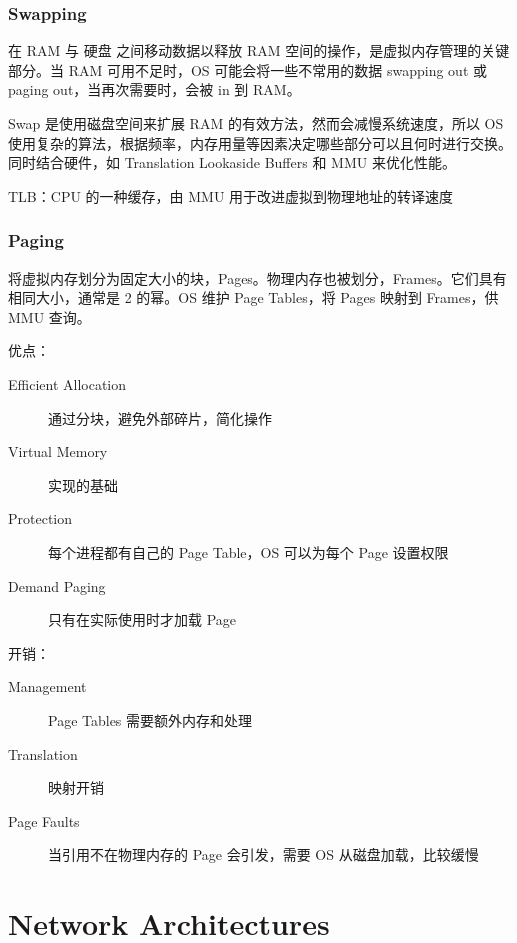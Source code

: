 \documentclass[11pt,journal,compsoc]{IEEEtran}
\begin{document}
\subsubsection{Swapping}

在 RAM 与 硬盘 之间移动数据以释放 RAM 空间的操作，是虚拟内存管理的关键部分。当 RAM 可用不足时，OS 可能会将一些不常用的数据 swapping out 或 paging out，当再次需要时，会被 in 到 RAM。

Swap 是使用磁盘空间来扩展 RAM 的有效方法，然而会减慢系统速度，所以 OS 使用复杂的算法，根据频率，内存用量等因素决定哪些部分可以且何时进行交换。同时结合硬件，如 Translation Lookaside Buffers 和 MMU 来优化性能。

TLB：CPU 的一种缓存，由 MMU 用于改进虚拟到物理地址的转译速度


\subsubsection{Paging}

将虚拟内存划分为固定大小的块，Pages。物理内存也被划分，Frames。它们具有相同大小，通常是 2 的幂。OS 维护 Page Tables，将 Pages 映射到 Frames，供 MMU 查询。

优点：

\begin{description}
    \item[Efficient Allocation] 通过分块，避免外部碎片，简化操作

    \item[Virtual Memory] 实现的基础

    \item[Protection] 每个进程都有自己的 Page Table，OS 可以为每个 Page 设置权限

    \item[Demand Paging] 只有在实际使用时才加载 Page
\end{description}

开销：

\begin{description}
    \item[Management] Page Tables 需要额外内存和处理

    \item[Translation] 映射开销

    \item[Page Faults] 当引用不在物理内存的 Page 会引发，需要 OS 从磁盘加载，比较缓慢
\end{description}


\section{Network Architectures}
\end{document}
